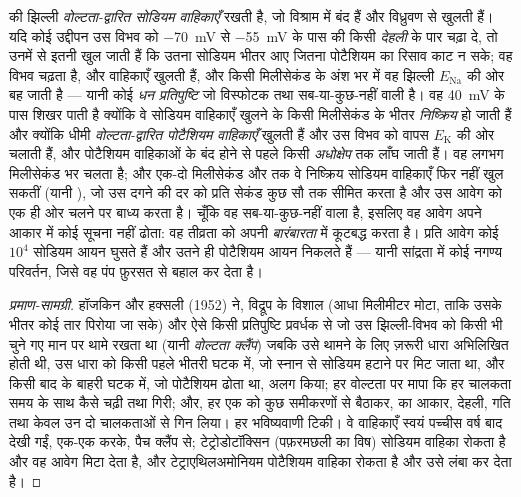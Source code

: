 \begin{proposition}[वह आवेग]\label{prop:b2:neurons-synapses:ap}
 की झिल्ली \emph{वोल्टता-द्वारित सोडियम वाहिकाएँ} रखती है, जो
विश्राम में बंद हैं और विध्रुवण से खुलती हैं। यदि कोई उद्दीपन उस
विभव को \qty{-70}{mV} से \qty{-55}{mV} के पास की किसी
\emph{देहली} के पार चढ़ा दे, तो उनमें से इतनी खुल जाती हैं कि उतना सोडियम भीतर आए जितना
पोटैशियम का रिसाव काट न सके; वह विभव चढ़ता है, और वाहिकाएँ खुलती हैं,
और किसी मिलीसेकंड के अंश भर में वह झिल्ली
$E_{\mathrm{Na}}$ की ओर बह जाती है --- यानी कोई \emph{धन प्रतिपुष्टि} जो विस्फोटक
तथा सब-या-कुछ-नहीं वाली है। वह \qty{+40}{mV} के पास शिखर पाती है क्योंकि वे सोडियम
वाहिकाएँ खुलने के किसी मिलीसेकंड के भीतर \emph{निष्क्रिय} हो जाती हैं और
क्योंकि धीमी \emph{वोल्टता-द्वारित पोटैशियम वाहिकाएँ} खुलती हैं और
उस विभव को वापस $E_{\mathrm K}$ की ओर चलाती हैं, और पोटैशियम वाहिकाओं के बंद होने से पहले
किसी \emph{अधोक्षेप} तक लाँघ जाती हैं। वह
\emph{} लगभग मिलीसेकंड भर चलता है; और एक-दो
मिलीसेकंड और तक वे निष्क्रिय सोडियम वाहिकाएँ फिर नहीं खुल सकतीं
(यानी \emph{}), जो उस दगने की दर को प्रति सेकंड कुछ
सौ तक सीमित करता है और उस आवेग को एक ही ओर चलने पर बाध्य करता है।
चूँकि वह सब-या-कुछ-नहीं वाला है, इसलिए वह आवेग अपने आकार में कोई सूचना नहीं ढोता:
वह  तीव्रता को अपनी \emph{बारंबारता} में कूटबद्ध करता है। प्रति आवेग कोई
$10^{4}$ सोडियम आयन घुसते हैं और उतने ही पोटैशियम आयन निकलते हैं
--- यानी सांद्रता में कोई नगण्य परिवर्तन, जिसे वह पंप
फ़ुरसत से बहाल कर देता है।
\end{proposition}
\begin{proof}[प्रमाण-सामग्री]
हॉजकिन और हक्सली (1952) ने, विद्रूप के विशाल  (आधा
मिलीमीटर मोटा, ताकि उसके भीतर कोई तार पिरोया जा सके) और ऐसे किसी
प्रतिपुष्टि प्रवर्धक से जो उस झिल्ली-विभव को किसी भी चुने गए मान पर थामे रखता था
(यानी \emph{वोल्टता क्लैंप}) जबकि उसे थामने के लिए ज़रूरी धारा
अभिलिखित होती थी, उस धारा को किसी पहले भीतरी घटक में, जो स्नान से सोडियम
हटाने पर मिट जाता था, और किसी बाद के
बाहरी घटक में, जो पोटैशियम ढोता था, अलग किया; हर वोल्टता पर मापा कि हर
चालकता समय के साथ कैसे चढ़ी तथा गिरी; और, हर एक को कुछ समीकरणों से बैठाकर,
 का आकार, देहली, गति तथा 
केवल उन दो चालकताओं से गिन लिया।
हर भविष्यवाणी टिकी। वे वाहिकाएँ स्वयं पच्चीस वर्ष बाद देखी गईं,
एक-एक करके, पैच क्लैंप से;
टेट्रोडोटॉक्सिन (पफ़रमछली का विष) सोडियम वाहिका रोकता है
और वह आवेग मिटा देता है, और टेट्राएथिलअमोनियम पोटैशियम
वाहिका रोकता है और उसे लंबा कर देता है।
\end{proof}

